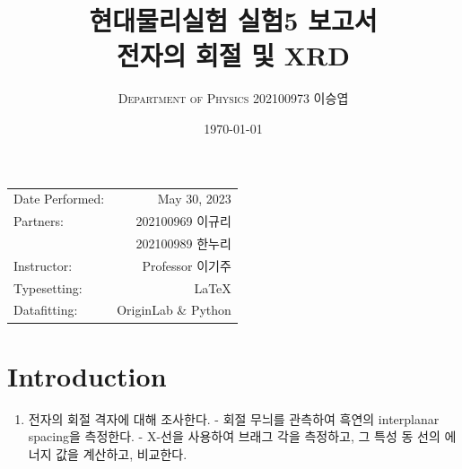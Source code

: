 \documentclass[a4paper, 10pt, nanum]{CSUniSchoolLabReport}
\title{현대물리실험 실험5 보고서 \\ 전자의 회절 및 XRD} %
\author{\textsc{Department of Physics} 202100973 이승엽}
\date{\today}
\begin{document}
\maketitle %

\begin{center}
	\begin{tabular}{l r}
		Date Performed: & May 30, 2023 \\ %
		Partners: & 202100969 이규리 \\ %
		& 202100989 한누리 \\
		Instructor: & Professor 이기주 \\ %
		Typesetting: & LaTeX \\
		Datafitting: & OriginLab \& Python \\
	\end{tabular}
\end{center}


\maketitle


\section{Introduction}

\begin{enumerate}[label=\arabic*.]
	\item 전자의 회절 격자에 대해 조사한다.
-	회절 무늬를 관측하여 흑연의 interplanar spacing을 측정한다.
-	X-선을 사용하여 브래그 각을 측정하고, 그 특성 동 선의 에너지 값을 계산하고, 비교한다.
\end{enumerate}



\end{document}
